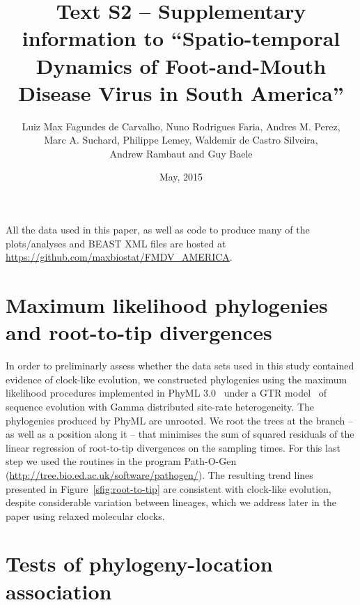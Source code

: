 \documentclass[a4paper,10pt]{article}
\title{Text S2 -- Supplementary information to ``Spatio-temporal Dynamics of Foot-and-Mouth Disease Virus in South America''}
\author{
Luiz Max Fagundes de Carvalho, Nuno Rodrigues Faria, Andres M. Perez,\\
Marc A. Suchard, Philippe Lemey, Waldemir de Castro Silveira,\\
Andrew Rambaut and Guy Baele
}
\date{May, 2015}
\begin{document}
\maketitle

All the data used in this paper, as well as code to produce many of the plots/analyses and BEAST XML files are hosted at \url{https://github.com/maxbiostat/FMDV_AMERICA}.

\section*{Maximum likelihood phylogenies and root-to-tip divergences}

In order to preliminarly assess whether the data sets used in this study contained evidence of clock-like evolution, we constructed phylogenies using the maximum likelihood procedures implemented in PhyML 3.0~\cite{M-phyml} under a GTR model~\cite{M-Tavare1986} of sequence evolution with Gamma distributed site-rate heterogeneity.
The phylogenies produced by PhyML are unrooted.
We root the trees at the branch -- as well as a position along it -- that minimises the sum of squared residuals of the linear regression of root-to-tip divergences on the sampling times.
For this last step we used the routines in the program Path-O-Gen (\url{http://tree.bio.ed.ac.uk/software/pathogen/}).
The resulting trend lines presented in Figure~\ref{sfig:root-to-tip} are consistent with clock-like evolution, despite considerable variation between lineages, which we address later in the paper using relaxed molecular clocks.

\section*{Tests of phylogeny-location association}
\end{document}
